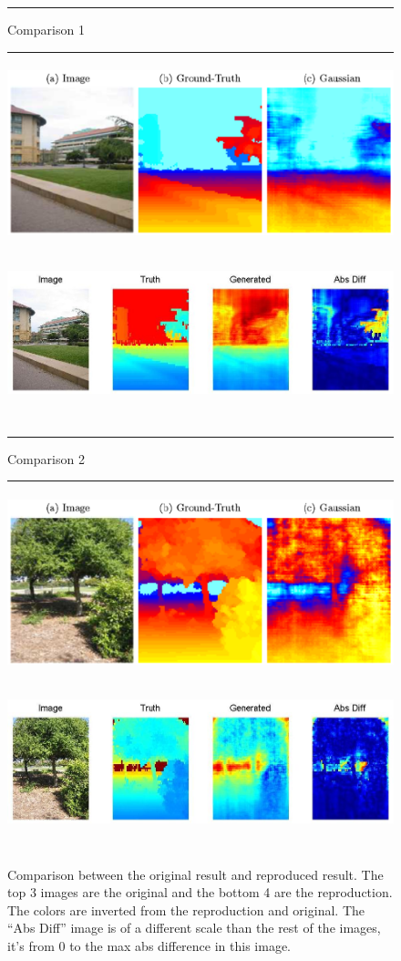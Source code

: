\documentclass[journal]{IEEEtran}
\begin{document}
\begin{figure}
\label{fig:comparison}
\centering
\hrule
\vspace{.01in}
{\large Comparison 1} \\
\hrule
\vspace{.1in}
\includegraphics[height=2in]{compare1.png} \\
\includegraphics[height=2in]{compare1.jpg} \\
\hrule
\vspace{.01in}
{\large Comparison 2} \\
\hrule
\vspace{.1in}
\includegraphics[height=2in]{compare2.png} \\
\includegraphics[height=2in]{compare2.jpg} \\
\caption{Comparison between the original result and reproduced result. The top 3 images are the original and the bottom 4 are the reproduction. The colors are inverted from the reproduction and original. The ``Abs Diff'' image is of a different scale than the rest of the images, it's from 0 to the max abs difference in this image.}
\end{figure}
\end{document}
